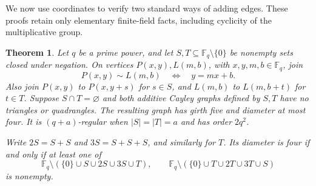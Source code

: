 \documentclass[11pt,a4paper]{article}
\newtheorem{theorem}{Theorem}
\newcommand{\F}{\mathbb F}
\begin{document}
We now use coordinates to verify two standard ways of adding edges.
These proofs retain only elementary finite-field facts, including
cyclicity of the multiplicative group.

\begin{theorem}\label{thm:additive}
Let $q$ be a prime power, and let $S,T\subseteq\F_q\setminus\{0\}$
be nonempty sets closed under negation. On vertices
$P(x,y),L(m,b)$, with $x,y,m,b\in\F_q$, join
\[
 P(x,y)\sim L(m,b)\quad\Longleftrightarrow\quad y=mx+b.
\]
Also join $P(x,y)$ to $P(x,y+s)$ for $s\in S$, and $L(m,b)$ to
$L(m,b+t)$ for $t\in T$. Suppose $S\cap T=\varnothing$ and both
additive Cayley graphs defined by $S,T$ have no triangles or quadrangles.
The resulting graph has girth five and diameter at most four.
It is $(q+a)$-regular when $|S|=|T|=a$ and has order $2q^2$.

Write $2S=S+S$ and $3S=S+S+S$, and similarly for $T$.
Its diameter is four if and only if at least one of
\[
 \F_q\setminus(\{0\}\cup S\cup2S\cup3S\cup T),\qquad
 \F_q\setminus(\{0\}\cup T\cup2T\cup3T\cup S)
\]
is nonempty.
\end{theorem}
\end{document}
